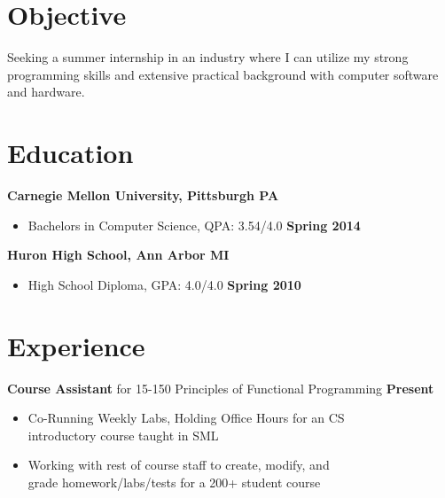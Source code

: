 \documentclass[sectioned]{dsyangres}
\begin{document}

\address{{\bf School Address} \\
  5032 forbes ave. SMC 4932 \\ Pittsburgh, PA 15289  \\
         }
\address{{\bf Home Address} \\
  5313 Betheny Circle \\
  Superior Township, MI 48198 \\
   }


\begin{resume}

\section{Objective}

Seeking a summer internship in an industry where I can utilize my strong programming
skills and extensive practical background with computer software and hardware.


\section{Education}

\textbf{Carnegie Mellon University, Pittsburgh PA}
  \begin{itemize}
    \item Bachelors in Computer Science, QPA: 3.54/4.0 \hfill \textbf{ Spring 2014}
  \end{itemize}

\textbf{Huron High School, Ann Arbor MI}
  \begin{itemize}
    \item High School Diploma, GPA: 4.0/4.0 \hfill \textbf{ Spring 2010}
  \end{itemize}


\section{Experience}

\textbf{Course Assistant} for 15-150 Principles of Functional
 Programming \hfill \textbf{Present}
 \begin{itemize} \itemsep -2pt
   \item Co-Running Weekly Labs, Holding Office Hours for an CS\\
     introductory course taught in SML
   \item Working with rest of course staff to create, modify, and\\
     grade homework/labs/tests for a 200+ student course
 \end{itemize}


\end{resume}
\end{document}
